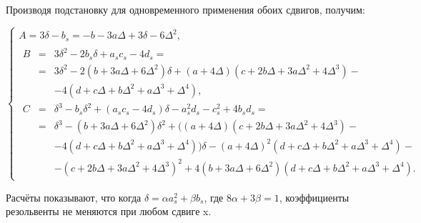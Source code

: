 \documentclass{article}
\begin{document}
Производя подстановку для одновременного применения обоих сдвигов, получим:

\begin{equation}
\begin{cases}
A = 3 \delta - b_s = -b - 3 a \Delta + 3 \delta - 6 \Delta^2, \\
\begin{array}{lll}
B & = & 3 \delta^2 - 2 b_s \delta + a_s c_s - 4 d_s =\\
& = & 3 \delta^2 - 2(b + 3 a \Delta + 6 \Delta^2) \delta + (a + 4 \Delta)(c + 2 b \Delta + 3 a \Delta^2 + 4 \Delta^3) - \\
&   & - 4(d + c \Delta + b \Delta^2 + a \Delta^3 + \Delta^4), \\
C & = & \delta^3 - b_s \delta^2 + (a_s c_s - 4 d_s) \delta - a_s^2 d_s - c_s^2 + 4 b_s d_s = \\
& = & \delta^3 - (b + 3 a \Delta + 6 \Delta^2) \delta^2 + ((a + 4 \Delta)(c + 2 b \Delta + 3 a \Delta^2 + 4 \Delta^3) - \\
&   & - 4(d + c \Delta + b \Delta^2 + a \Delta^3 + \Delta^4)) \delta - (a + 4 \Delta)^2(d + c \Delta + b \Delta^2 + a \Delta^3 + \Delta^4) - \\
&   & - (c + 2 b \Delta + 3 a \Delta^2 + 4 \Delta^3)^2 + 4(b + 3 a \Delta + 6 \Delta^2)(d + c \Delta + b \Delta^2 + a \Delta^3 + \Delta^4). 
\end{array}
\end{cases}
\end{equation}

Расчёты показывают, что когда $\delta = \alpha a_s^2 + \beta b_s$, где $8 \alpha +3 \beta = 1$, коэффициенты резольвенты не меняются при любом сдвиге x.
\end{document}
